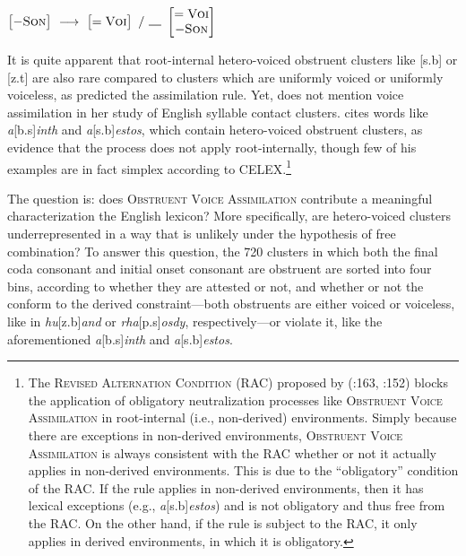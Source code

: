 \begin{example}
$\begin{bmatrix} -\textsc{Son} \end{bmatrix}~\goesto~\begin{bmatrix} =\textsc{Voi} \end{bmatrix}~/~\gap~\begin{bmatrix} =\textsc{Voi} \\ -\textsc{Son} \end{bmatrix}$
\end{example}

It is quite apparent that root-internal hetero-voiced obstruent clusters like [s.b] or [z.t] are also rare compared to clusters which are uniformly voiced or uniformly voiceless, as predicted the assimilation rule. Yet, \citet{Pierrehumbert1994} does not mention voice assimilation in her study of English syllable contact clusters. \citet[][74f.]{Hammond1999a} cites words like \emph{a}[b.s]\emph{inth} and \emph{a}[s.b]\emph{estos}, which contain hetero-voiced obstruent clusters, as evidence that the process does not apply root-internally, though few of his examples are in fact simplex according to CELEX.\footnote{The \textsc{Revised Alternation Condition} (RAC) proposed by \citeauthor{Kiparsky1973a} (\citeyear{Kiparsky1973a}:163, \citeyear{Kiparsky1982a}:152) blocks the application of obligatory neutralization processes like \textsc{Obstruent Voice Assimilation} in root-internal (i.e., non-derived) environments. Simply because there are exceptions in non-derived environments, \textsc{Obstruent Voice Assimilation} is always consistent with the RAC whether or not it actually applies in non-derived environments. This is due to the ``obligatory'' condition of the RAC. If the rule applies in non-derived environments, then it has lexical exceptions (e.g., \emph{a}[s.b]\emph{estos}) and is not obligatory and thus free from the RAC. On the other hand, if the rule is subject to the RAC, it only applies in derived environments, in which it is obligatory.}

The question is: does \textsc{Obstruent Voice Assimilation} contribute a meaningful characterization the English lexicon? More specifically, are hetero-voiced clusters underrepresented in a way that is unlikely under the hypothesis of free combination? To answer this question, the 720 clusters in which both the final coda consonant and initial onset consonant are obstruent are sorted into four bins, according to whether they are attested or not, and whether or not the conform to the derived constraint---both obstruents are either voiced or voiceless, like in \emph{hu}[z.b]\emph{and} or \emph{rha}[p.s]\emph{osdy}, respectively---or violate it, like the aforementioned \emph{a}[b.s]\emph{inth} and \emph{a}[s.b]\emph{estos}. 

